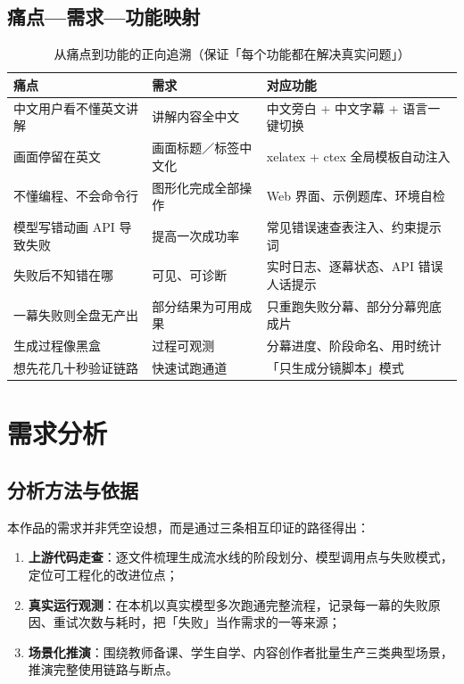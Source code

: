 \documentclass[11pt,a4paper]{ctexart}
\begin{document}
\subsection{痛点—需求—功能映射}

\begin{table}[htbp]
\centering
\small
\caption{从痛点到功能的正向追溯（保证「每个功能都在解决真实问题」）}
\begin{tabularx}{\textwidth}{@{}p{3.4cm} p{4.2cm} X@{}}
\toprule
\textbf{痛点} & \textbf{需求} & \textbf{对应功能} \\
\midrule
中文用户看不懂英文讲解 & 讲解内容全中文 & 中文旁白 + 中文字幕 + 语言一键切换 \\
画面停留在英文 & 画面标题／标签中文化 & xelatex + ctex 全局模板自动注入 \\
不懂编程、不会命令行 & 图形化完成全部操作 & Web 界面、示例题库、环境自检 \\
模型写错动画 API 导致失败 & 提高一次成功率 & 常见错误速查表注入、约束提示词 \\
失败后不知错在哪 & 可见、可诊断 & 实时日志、逐幕状态、API 错误人话提示 \\
一幕失败则全盘无产出 & 部分结果为可用成果 & 只重跑失败分幕、部分分幕兜底成片 \\
生成过程像黑盒 & 过程可观测 & 分幕进度、阶段命名、用时统计 \\
想先花几十秒验证链路 & 快速试跑通道 & 「只生成分镜脚本」模式 \\
\bottomrule
\end{tabularx}
\end{table}

\section{需求分析}

\subsection{分析方法与依据}

本作品的需求并非凭空设想，而是通过三条相互印证的路径得出：

\begin{enumerate}
  \item \textbf{上游代码走查}：逐文件梳理生成流水线的阶段划分、模型调用点与失败模式，定位可工程化的改进位点；
  \item \textbf{真实运行观测}：在本机以真实模型多次跑通完整流程，记录每一幕的失败原因、重试次数与耗时，把「失败」当作需求的一等来源；
  \item \textbf{场景化推演}：围绕教师备课、学生自学、内容创作者批量生产三类典型场景，推演完整使用链路与断点。
\end{enumerate}
\end{document}
